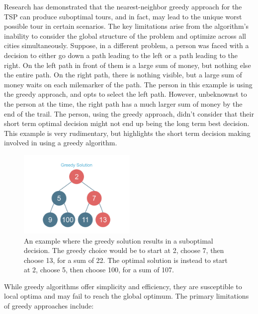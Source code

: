 \documentclass[11pt]{report}
\begin{document}
        Research has demonstrated that the nearest-neighbor greedy approach for the TSP can produce suboptimal tours\cite{cirasella2001asymmetric}, and in fact, may lead to the unique worst possible tour in certain scenarios\cite{gutin2005evaluation}. The key limitations arise from the algorithm's inability to consider the global structure of the problem and optimize across all cities simultaneously\cite{GUTIN200281}. Suppose, in a different problem, a person was faced with a decision to either go down a path leading to the left or a path leading to the right. On the left path in front of them is a large sum of money, but nothing else the entire path. On the right path, there is nothing visible, but a large sum of money waits on each milemarker of the path. The person in this example is using the greedy approach, and opts to select the left path. However, unbeknownst to the person at the time, the right path has a much larger sum of money by the end of the trail. The person, using the greedy approach, didn't consider that their short term optimal decision might not end up being the long term best decision. This example is very rudimentary, but highlights the short term decision making involved in using a greedy algorithm.  

        \begin{figure}[h!]
            \centering
            \includegraphics[width=0.5\textwidth,keepaspectratio]{Images/greedy-solution.jpg}
            \caption{An example where the greedy solution results in a suboptimal decision. The greedy choice would be to start at 2, choose 7, then choose 13, for a sum of 22. The optimal solution is instead to start at 2, choose 5, then choose 100, for a sum of 107.}
            \label{fig:greedy-bad}
        \end{figure}

        While greedy algorithms offer simplicity and efficiency, they are susceptible to local optima and may fail to reach the global optimum. The primary limitations of greedy approaches include:
\end{document}
